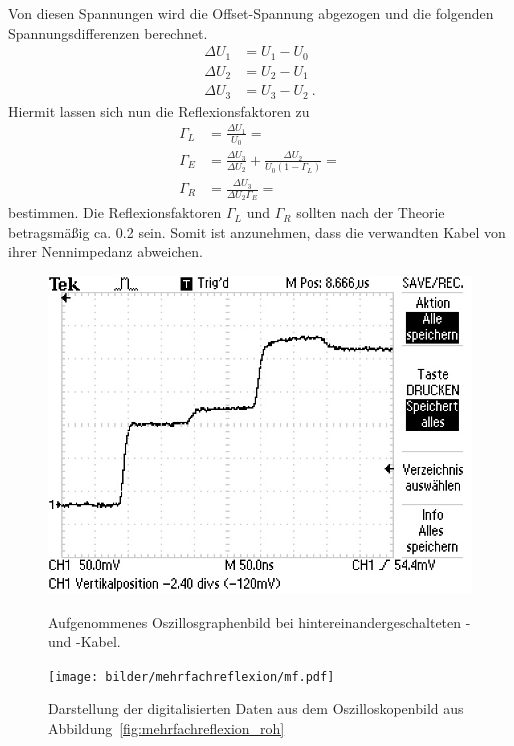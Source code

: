 Von diesen Spannungen wird die Offset-Spannung abgezogen und die folgenden
Spannungsdifferenzen berechnet.
\begin{align*}
  \Delta U_1 &= U_1 - U_0 \\
  \Delta U_2 &= U_2 - U_1 \\
  \Delta U_3 &= U_3 - U_2~.
\end{align*}
Hiermit lassen sich nun die Reflexionsfaktoren zu
\begin{align*}
  \Gamma_L &= \frac{\Delta U_1}{U_0} =  \\
  \Gamma_E &= \frac{\Delta U_3}{\Delta U_2} +
  \frac{\Delta U_2}{U_0(1 - \Gamma_L)}
  =  \\
  \Gamma_R &= \frac{\Delta U_3}{\Delta U_2 \Gamma_E}
  = 
\end{align*}
bestimmen.
Die Reflexionsfaktoren $\Gamma_L$ und $\Gamma_R$ sollten nach der Theorie
betragsmäßig ca. 0.2 sein. Somit ist anzunehmen, dass die verwandten Kabel von
ihrer Nennimpedanz abweichen.

\begin{figure}[htpb]
  \centering
  \includegraphics[scale=1.0]{bilder/mehrfachreflexion/F0000TEK.JPG}
  \caption{Aufgenommenes Oszillosgraphenbild bei hintereinandergeschalteten
    \CU- und \BU-Kabel.}
\label{fig:mehrfachreflexion_roh}
  \texttt{[image: bilder/mehrfachreflexion/mf.pdf]}
  \caption{Darstellung der digitalisierten Daten aus dem
    Oszilloskopenbild aus Abbildung~\ref{fig:mehrfachreflexion_roh}}
\label{fig:mehrfachreflexion}
\end{figure}

